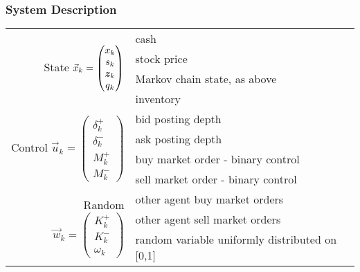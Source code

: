 
\begin{frame}
\frametitle{System Description}
\begin{adjustbox}{width=\textwidth}
\begin{tabular}{rl}
\multirow{4}{*}{State $\vec{x}_{k} = \begin{pmatrix}
x_k \\
s_k \\
\bm{z}_k \\
q_k 
\end{pmatrix}$} & cash \\
& stock price \\
& Markov chain state, as above \\
& inventory \\[4ex]
\multirow{4}{*}{Control $\vec{u}_{k} = \begin{pmatrix}
\delta_k^+ \\
\delta_k^- \\
M_k^+ \\
M_k^-
\end{pmatrix}$} & bid posting depth \\
& ask posting depth \\
& buy market order - binary control \\
& sell market order - binary control \\[4ex]
\multirow{3}{*}{
Random $\vec{w}_{k} = \begin{pmatrix}
K_k^+ \\
K_k^- \\
\omega_k
\end{pmatrix}$}
& other agent buy market orders \\
& other agent sell market orders \\
& random variable uniformly distributed on [0,1]
\end{tabular}
\end{adjustbox}
\end{frame}

